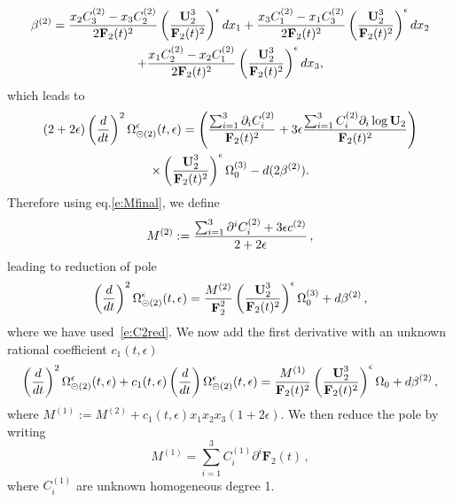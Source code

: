 \documentclass[a4paper,12pt]{article}
\newcommand\lNote[1]{
	\todo[backgroundcolor=red!20!white,fancyline,
	bordercolor=white]{ LDLC:  #1}}
\numberwithin{equation}{section}
\numberwithin{figure}{section}
\def\su{\circleddash}
\begin{document}
 \begin{multline}
 	\label{eq:beta-equalmass-sunset}
   \beta^{(2)}=   {x_2  C_3^{(2)}-x_3  C_2^{(2)}\over
   2  \textbf{F}_2(t)^2} \left(\textbf{U}_2^3\over \textbf{F}_2(t)^2\right)^\epsilon dx_1+   {x_3  C_1^{(2)}-x_1 C_3^{(2)}\over
    2 \textbf{F}_2(t)^2} \left(\textbf{U}_2^3\over \textbf{F}_2(t)^2\right)^\epsilon dx_2\cr
   +  {x_1  C_2^{(2)}-x_2  C_1^{(2)}\over
    2 \textbf{F}_2(t)^2} \left(\textbf{U}_2^3\over \textbf{F}_2(t)^2\right)^\epsilon dx_3, 
 \end{multline}
which leads to 
%
\begin{multline}
 (2+2\epsilon)\left(d\over dt\right)^2
  \Omega_{\su(2)}^{\epsilon}(t,\epsilon)=
 \left({\sum_{i=1}^3 \partial_i C_i^{(2)}\over
     \textbf{F}_2(t)^{2}}+3\epsilon{\sum_{i=1}^3 C_i^{(2)}\partial_i
     \log \textbf{U}_2\over \textbf{F}_2(t)^{2}}\right)\cr \times\left(\textbf{U}_2^3\over \textbf{F}_2(t)^2\right)^\epsilon \Omega_0^{(3)}-d(2\beta^{(2)}).
\end{multline}
%
Therefore using eq.\eqref{e:Mfinal}, we define
\begin{equation}
  \label{e:M2}
  M^{(2)}:={\sum_{i=1}^3 \partial^i  C_i^{(2)}+3\epsilon
    c^{(2)}\over 2+2\epsilon} \,, 
\end{equation}
leading to reduction of pole
\begin{equation}
 \left(d\over dt\right)^2
  \Omega_{\su(2)}^{\epsilon}(t,\epsilon)=
{M^{(2)}\over
     \textbf{F}_2^{2}}\left(\textbf{U}_2^3\over \textbf{F}_2(t)^2\right)^\epsilon \Omega_0^{(3)}+d\beta^{(2)} \, ,
 \end{equation}
where we have used~\eqref{e:C2red}.
%
We now add the first derivative with an unknown rational coefficient $c_1(t,\epsilon)$
\begin{multline}
 \left(d\over dt\right)^2
  \Omega_{\su(2)}^{\epsilon}(t,\epsilon) +c_1(t,\epsilon) \left(d\over dt\right)
  \Omega_{\su(2)}^{\epsilon}(t,\epsilon) =
{M^{(1)}\over
     \textbf{F}_2(t)^{2}}\left(\textbf{U}_2^3\over \textbf{F}_2(t)^2\right)^\epsilon \Omega_0+d\beta^{(2)} \, , 
 \end{multline}
where $M^{(1)}:=M^{(2)}+c_1(t,\epsilon) x_1x_2x_3(1+2\epsilon)$.
 We then reduce the pole by writing
 \begin{equation}\label{e:M2red}
   M^{(1)}= \sum_{i=1}^3
   C_i^{(1)} \partial^i \textbf{F}_2(t) \,, 
 \end{equation}
 where $ C_i^{(1)}$ are unknown homogeneous degree 1.
\end{document}
